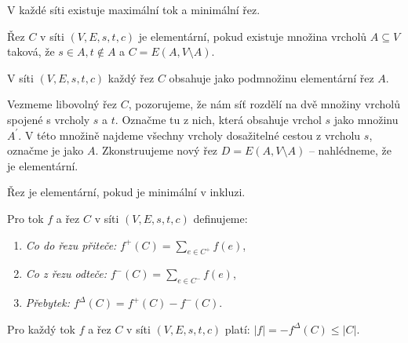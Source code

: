 \begin{t_fact}
  V každé síti existuje maximální tok a minimální řez.
\end{t_fact}

\begin{t_definition}
  Řez $C$ v síti $(V, E, s, t, c)$ je elementární, pokud existuje množina vrcholů $A\subseteq V$ taková, že $s\in A,t\notin A$ a $C=E(A,V\setminus A)$.
\end{t_definition}

\begin{t_lemma}
  V síti $(V, E, s, t, c)$ každý řez $C$ obsahuje jako podmnožinu elementární řez $A$.
\end{t_lemma}

\begin{t_proof}
  Vezmeme libovolný řez $C$, pozorujeme, že nám síť rozdělí na dvě množiny vrcholů spojené s vrcholy $s$ a $t$. Označme tu z nich, která obsahuje vrchol $s$ jako množinu $A^\prime$. V této množině najdeme všechny vrcholy dosažitelné cestou z vrcholu $s$, označme je jako $A$. Zkonstruujeme nový řez $D=E(A,V\setminus A)$ – nahlédneme, že je elementární.
\end{t_proof}

\begin{t_corollary}
  Řez je elementární, pokud je minimální v inkluzi.
\end{t_corollary}

\begin{t_definition}
  Pro tok $f$ a řez $C$ v síti $(V, E, s, t, c)$ definujeme:
  \begin{enumerate}
    \item \textit{Co do řezu přiteče:} $f^+(C)=\sum_{e\in C^+} f(e)$,
    \item \textit{Co z řezu odteče:} $f^-(C)=\sum_{e\in C^-} f(e)$,
    \item \textit{Přebytek:} $f^\Delta(C)=f^+(C)-f^-(C)$.
  \end{enumerate}
\end{t_definition}

\begin{t_lemma}
  Pro každý tok $f$ a řez $C$ v síti $(V, E, s, t, c)$ platí: $|f|=-f^\Delta(C)\leq|C|$.
\end{t_lemma}

